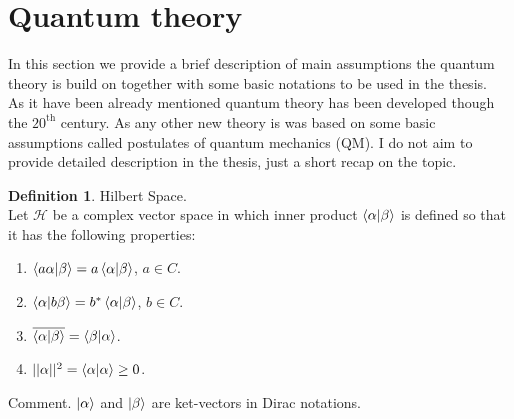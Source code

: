 \documentclass[twoside,english]{uiofysmaster}
\theoremstyle{definition}
\newtheorem{defn}{Definition}
\begin{document}
\section{Quantum theory}
In this section we provide a brief description of main assumptions the quantum theory is build on together with some basic notations to be used in the thesis.\\
As it have been already mentioned quantum theory has been developed though the $20^{\text{th}}$ century. As any other new theory is was based on some basic assumptions called postulates of quantum mechanics (QM). I do not aim to provide detailed description in the thesis, just a short recap on the topic. \\

\begin{defn} Hilbert Space.\\
	Let $\mathscr{H}$ be a complex vector space  in which inner product $\braket{\alpha|\beta}$ is defined so that it has the following properties:
	\begin{enumerate}		
		\item $\braket{a\alpha|\beta} = a\braket{\alpha|\beta}$, $a \in C$.
		\item $\braket{\alpha|b\beta} = b^{*}\braket{\alpha|\beta}$, $b \in C$.
		\item $\overline{\braket{\alpha|\beta}} =\braket{\beta|\alpha}$.
		\item $||\alpha||^2= \braket{\alpha|\alpha} \geq 0 $.			
	\end{enumerate}
Comment. $\ket{\alpha}$ and  $\ket{\beta}$ are ket-vectors in Dirac notations.
\end{defn}
\end{document}
